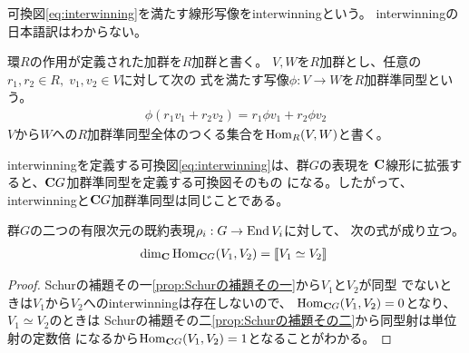 	\begin{definition}[interwinning]\label{def:interwinning} %
		可換図\eqref{eq:interwinning}を満たす線形写像をinterwinningという。
		interwinningの日本語訳はわからない。
	\end{definition} %

	環$R$の作用が定義された加群を$R$加群と書く。
	$V,W$を$R$加群とし、任意の$r_1,r_2\in R,\;v_1,v_2\in V$に対して次の
	式を満たす写像$\phi:V\to W$を$R$加群準同型という。
	\begin{equation*}\begin{split} %
		\phi(r_1v_1+r_2v_2) = r_1\phi v_1 + r_2\phi v_2
	\end{split}\end{equation*} %
	$V$から$W$への$R$加群準同型全体のつくる集合を$\operatorname{Hom}_R(V,W)$と書く。

	interwinningを定義する可換図\eqref{eq:interwinning}は、群$G$の表現を
	${\mathbf{C}}$線形に拡張すると、${\mathbf{C}} G$加群準同型を定義する可換図そのもの
	になる。したがって、interwinningと${\mathbf{C}} G$加群準同型は同じことである。

	\begin{proposition}[Schurの補題の言い換え]\label{prop:Schurの補題の言い換え} %
		群$G$の二つの有限次元の既約表現$\rho_i:G\to \operatorname{End} V_i$に対して、
		次の式が成り立つ。
		\begin{equation*}\begin{split} %
			\dim_\fukuso\Hom_{\fukuso G}(V_1,V_2) = \jump{V_1\simeq V_2}
		\end{split}\end{equation*} %
	\end{proposition} %
	\begin{proof} %
		Schurの補題その一\ref{prop:Schurの補題その一}から$V_1$と$V_2$が同型
		でないときは$V_1$から$V_2$へのinterwinningは存在しないので、
		$\operatorname{Hom}_{{\mathbf{C}} G}(V_1,V_2)=0$となり、$V_1\simeq V_2$のときは
		Schurの補題その二\ref{prop:Schurの補題その二}から同型射は単位射の定数倍
		になるから$\operatorname{Hom}_{{\mathbf{C}} G}(V_1,V_2)=1$となることがわかる。
	\end{proof} %

